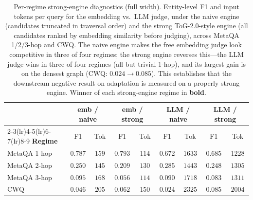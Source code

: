 \begin{table}[t]
\centering
\caption{Per-regime strong-engine diagnostics (full width). Entity-level F1 and input tokens per query for the embedding vs.\ LLM judge, under the naive engine (candidates truncated in traversal order) and the strong ToG-2.0-style engine (all candidates ranked by embedding similarity before judging), across MetaQA 1/2/3-hop and CWQ. The naive engine makes the free embedding judge look competitive in three of four regimes; the strong engine reverses this---the LLM judge wins in three of four regimes (all but trivial 1-hop), and its largest gain is on the densest graph (CWQ: $0.024\!\to\!0.085$). This establishes that the downstream negative result on adaptation is measured on a properly strong engine. Winner of each strong-engine regime in \textbf{bold}.}
\label{tab:perhop}
\small
\begin{tabular}{@{}lcccccccc@{}}
\toprule
& \multicolumn{2}{c}{\textbf{emb / naive}} & \multicolumn{2}{c}{\textbf{emb / strong}} & \multicolumn{2}{c}{\textbf{LLM / naive}} & \multicolumn{2}{c}{\textbf{LLM / strong}} \\
\cmidrule(lr){2-3}\cmidrule(lr){4-5}\cmidrule(lr){6-7}\cmidrule(lr){8-9}
\textbf{Regime} & F1 & Tok & F1 & Tok & F1 & Tok & F1 & Tok \\
\midrule
MetaQA 1-hop & $0.787$ & $159$ & $\mathbf{0.793}$ & $114$ & $0.672$ & $1633$ & $0.685$ & $1228$ \\
MetaQA 2-hop & $0.250$ & $145$ & $0.209$ & $130$ & $0.285$ & $1443$ & $\mathbf{0.248}$ & $1305$ \\
MetaQA 3-hop & $0.095$ & $168$ & $0.056$ & $114$ & $0.090$ & $1718$ & $\mathbf{0.083}$ & $1311$ \\
CWQ          & $0.046$ & $205$ & $0.062$ & $150$ & $0.024$ & $2325$ & $\mathbf{0.085}$ & $2004$ \\
\bottomrule
\end{tabular}
\end{table}
